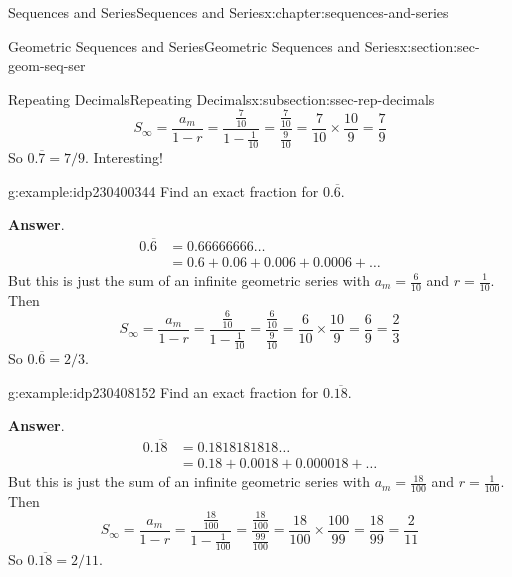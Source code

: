 \documentclass[twoside,10pt,]{book}
\newcommand{\blocktitlefont}{\relax}
\numberwithin{equation}{section}
\newcommand{\amp}{&}
\begin{document}
\begin{chapterptx}{Sequences and Series}{}{Sequences and Series}{}{}{x:chapter:sequences-and-series}
\begin{sectionptx}{Geometric Sequences and Series}{}{Geometric Sequences and Series}{}{}{x:section:sec-geom-seq-ser}
\begin{subsectionptx}{Repeating Decimals}{}{Repeating Decimals}{}{}{x:subsection:ssec-rep-decimals}
\begin{equation*}
{S_\infty } = \frac{{{a_m}}}{{1 - r}} = \frac{{\frac{7}{{10}}}}{{1 - \frac{1}{{10}}}} = \frac{{\frac{7}{{10}}}}{{\frac{9}{{10}}}} = \frac{7}{{10}} \times \frac{{10}}{9} = \frac{7}{9}
\end{equation*}
So \(0.\overline 7 = 7/9\).  Interesting! \begin{example}{}{g:example:idp230400344}%
Find an exact fraction for \(0.\overline 6 \).\par\smallskip%
\noindent\textbf{\blocktitlefont Answer}.\label{g:answer:idp230401240}{}\hypertarget{g:answer:idp230401240}{}\quad{}%
\begin{align*}
0.\overline 6  \amp = 0.66666666\ldots\\
\amp = 0.6 + 0.06 + 0.006 + 0.0006 + \ldots
\end{align*}
But this is just the sum of an infinite geometric series with \(a_m = \frac{6}{10}\) and \(r = \frac{1}{10}\).  Then%
\begin{equation*}
{S_\infty } = \frac{{{a_m}}}{{1 - r}} = \frac{{\frac{6}{{10}}}}{{1 - \frac{1}{{10}}}} = \frac{{\frac{6}{{10}}}}{{\frac{9}{{10}}}} = \frac{6}{{10}} \times \frac{{10}}{9} = \frac{6}{9} = \frac{2}{3}
\end{equation*}
So \(0.\overline 6 = 2/3\).\end{example}
 \begin{example}{}{g:example:idp230408152}%
Find an exact fraction for \(0.\overline {18}\).\par\smallskip%
\noindent\textbf{\blocktitlefont Answer}.\label{g:answer:idp230410328}{}\hypertarget{g:answer:idp230410328}{}\quad{}%
\begin{align*}
0.\overline {18}  \amp = 0.1818181818\ldots\\
\amp  = 0.18 + 0.0018 + 0.000018 + \ldots
\end{align*}
But this is just the sum of an infinite geometric series with \(a_m = \frac{18}{100}\) and \(r = \frac{1}{100}\).  Then%
\begin{equation*}
{S_\infty } = \frac{{{a_m}}}{{1 - r}} = \frac{{\frac{{18}}{{100}}}}{{1 - \frac{1}{{100}}}} = \frac{{\frac{{18}}{{100}}}}{{\frac{{99}}{{100}}}} = \frac{{18}}{{100}} \times \frac{{100}}{{99}} = \frac{{18}}{{99}} = \frac{2}{{11}}
\end{equation*}
So \(0.\overline {18} = 2/11\).\end{example}
%
\end{subsectionptx}
%
%
\typeout{************************************************}

\end{sectionptx}
\end{chapterptx}
\end{document}

